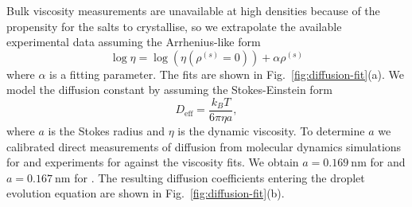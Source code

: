 \documentclass[11pt,twoside]{report}
\begin{document}
Bulk viscosity measurements are unavailable at high densities because of the propensity for the salts to crystallise, so we extrapolate the available experimental data \cite{PowerCS2013,BaldelliAST2016} assuming the Arrhenius-like form
\begin{equation}\label{eq:vft-fit}
  \log{\eta}
  =
  \log{\left(\eta(\rho^{(s)} = 0)\right)}
  + \alpha \rho^{(s)}
\end{equation}
where $\alpha$ is a fitting parameter.
The fits are shown in Fig.\ \ref{fig:diffusion-fit}(a).
We model the diffusion constant by assuming the Stokes-Einstein form
\begin{equation}\label{eq:stokes-einstein}
  D_\mathrm{eff} = \frac{k_B T}{6 \pi \eta a},
\end{equation}
where $a$ is the Stokes radius and $\eta$ is the dynamic viscosity.
To determine $a$ we calibrated direct measurements of diffusion from molecular dynamics simulations for  \cite{LyubartsevJPC1996} and experiments for  \cite{YehJCED1970} against the viscosity fits.
We obtain $a=\SI{0.169}{\nano\metre}$ for  and $a=\SI{0.167}{\nano\metre}$ for .
The resulting diffusion coefficients entering the droplet evolution equation are shown in Fig.\ \ref{fig:diffusion-fit}(b).
\end{document}
